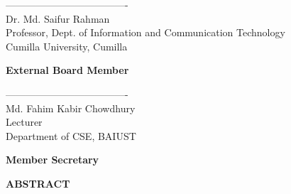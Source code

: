 \documentclass[12pt,a4paper]{report}
\begin{document}
\vspace{1.8cm}

\noindent
\begin{minipage}[t]{0.6\textwidth}
     ------------------------------------- \\
    Dr. Md. Saifur Rahman \\
    Professor, Dept. of Information and Communication Technology \\
    Cumilla University, Cumilla
\end{minipage}
\hfill
\begin{minipage}[t]{0.35\textwidth}
    \raggedleft
    \textbf{External Board Member}
\end{minipage}

\vspace{1.8cm}

\noindent
\begin{minipage}[t]{0.6\textwidth}
     ------------------------------------- \\
    Md. Fahim Kabir Chowdhury \\
    Lecturer \\
    Department of CSE, BAIUST
\end{minipage}
\hfill
\begin{minipage}[t]{0.35\textwidth}
    \raggedleft
    \textbf{Member Secretary}
\end{minipage}
\clearpage

\clearpage
\thispagestyle{plain}


\begin{center}
    \textbf{\Large ABSTRACT}
\end{center}

\vspace{0.5cm}
\end{document}
